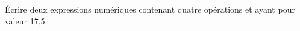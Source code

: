 \documentclass[exercice]{thedocument}%
\begin{document}
%
Écrire deux expressions numériques contenant quatre opérations et ayant pour valeur 17,5.
\end{document}
